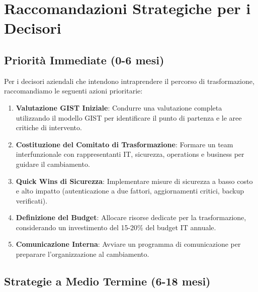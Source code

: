 \section{\texorpdfstring{Raccomandazioni Strategiche per i Decisori}{5.7 - Raccomandazioni Strategiche per i Decisori}}
\label{sec:5.7}

\subsection{\texorpdfstring{Priorità Immediate (0-6 mesi)}{5.7.1 - Priorità Immediate (0-6 mesi)}}
\label{subsec:5.7.1}

Per i decisori aziendali che intendono intraprendere il percorso di trasformazione, raccomandiamo le seguenti azioni prioritarie:

\begin{tcolorbox}[
    colback=red!5!white,
    colframe=red!75!black,
    title={\textbf{Azioni Critiche Immediate}},
    fonttitle=\bfseries
]

\begin{enumerate}
\item \textbf{Valutazione GIST Iniziale}: Condurre una valutazione completa utilizzando il modello GIST per identificare il punto di partenza e le aree critiche di intervento.

\item \textbf{Costituzione del Comitato di Trasformazione}: Formare un team interfunzionale con rappresentanti IT, sicurezza, operations e business per guidare il cambiamento.

\item \textbf{Quick Wins di Sicurezza}: Implementare misure di sicurezza a basso costo e alto impatto (autenticazione a due fattori, aggiornamenti critici, backup verificati).

\item \textbf{Definizione del Budget}: Allocare risorse dedicate per la trasformazione, considerando un investimento del 15-20\% del budget IT annuale.

\item \textbf{Comunicazione Interna}: Avviare un programma di comunicazione per preparare l'organizzazione al cambiamento.
\end{enumerate}

\end{tcolorbox}

\subsection{\texorpdfstring{Strategie a Medio Termine (6-18 mesi)}{5.7.2 - Strategie a Medio Termine (6-18 mesi)}}
\label{subsec:5.7.2}

